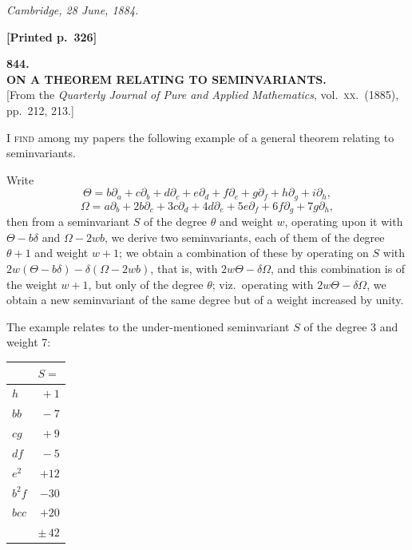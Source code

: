 \documentclass[11pt]{article}
\begin{document}
\medskip

\hfill\textit{Cambridge, 28 June, 1884.}


\newpage

\noindent\textbf{[Printed p.~326]}\hfill

\bigskip

\begin{center}
{\large\textbf{844.}}\\[0.7em]
{\large\textbf{ON A THEOREM RELATING TO SEMINVARIANTS.}}\\[1em]
{\small [From the \textit{Quarterly Journal of Pure and Applied Mathematics}, vol.\ \textsc{xx}.\ (1885), pp.\ 212, 213.]}
\end{center}

\bigskip

\noindent I \textsc{find} among my papers the following example of a general theorem relating to seminvariants.

\medskip

Write
\[
\Theta = b\partial_{a} + c\partial_{b} + d\partial_{c} + e\partial_{d} + f\partial_{e} + g\partial_{f} + h\partial_{g} + i\partial_{h},
\]
\[
\Omega = a\partial_{b} + 2b\partial_{c} + 3c\partial_{d} + 4d\partial_{e} + 5e\partial_{f} + 6f\partial_{g} + 7g\partial_{h},
\]
then from a seminvariant $S$ of the degree $\theta$ and weight $w$, operating upon it with $\Theta - b\delta$ and $\Omega - 2w b$, we derive two seminvariants, each of them of the degree $\theta + 1$ and weight $w + 1$; we obtain a combination of these by operating on $S$ with $2w(\Theta - b\delta) - \delta(\Omega - 2w b)$, that is, with $2w\Theta - \delta\Omega$, and this combination is of the weight $w + 1$, but only of the degree $\theta$; viz.\ operating with $2w\Theta - \delta\Omega$, we obtain a new seminvariant of the same degree but of a weight increased by unity.

\medskip

The example relates to the under-mentioned seminvariant $S$ of the degree 3 and weight 7:

\medskip

\begin{center}
\begin{tabular}{|l|r|}
\hline
 & $S =$ \\
\hline
$h$ & $+\ 1$ \\
$bb$ & $-\ 7$ \\
$cg$ & $+\ 9$ \\
$df$ & $-\ 5$ \\
$e^{2}$ & $+12$ \\
$b^{2}f$ & $-30$ \\
$bcc$ & $+20$ \\
\hline
 & $\pm\,42$ \\
\hline
\end{tabular}
\end{center}
\end{document}
